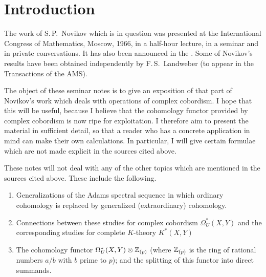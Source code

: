\documentclass[../main]{subfiles}
\begin{document}
\chapter{Introduction}
\label{sec:p1c1}

The work of S.\,P.~Novikov which is in question was presented at the International Congress of Mathematics, Moscow, 1966, in a half-hour lecture, in a seminar and in private conversations. 
It has also been announced in the \cite{novikov2}.
Some of Novikov's results have been obtained independently by F.\,S.~Landweber (to appear in the Transactions of the AMS).

The object of these seminar notes is to give an exposition of that part of Novikov's work which deals with operations of complex cobordism.
I hope that this will be useful, because I believe that the cohomology functor provided by complex cobordism is now ripe for exploitation.
I therefore aim to present the material in sufficient detail, so that a reader who has a concrete application in mind can make their own calculations. 
In particular, I will give certain formulae which are not made explicit in the sources cited above.

These notes will not deal with any of the other topics which are mentioned in the sources cited above. 
These include the following.
\begin{enumerate}[label=(\roman*)] %
\item Generalizations of the Adams spectral sequence in which ordinary cohomology is replaced by generalized (extraordinary) cohomology.
\item Connections between these studies for complex cobordism $\Omega_U^* (X, Y)$ and the corresponding studies for complete $K$-theory $K^* (X, Y)$
\item The cohomology functor $\Omega_U^* (X, Y) \otimes \mathbb{Z}_{(p)}$ (where $\mathbb{Z}_{(p)}$ is the ring of rational numbers $a/b$ with $b$ prime to $p$); and the splitting of this functor into direct summands. %
\end{enumerate}
\end{document}
